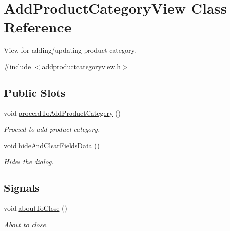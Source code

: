 \hypertarget{class_add_product_category_view}{\section{\-Add\-Product\-Category\-View \-Class \-Reference}
\label{class_add_product_category_view}
}


\-View for adding/updating product category.  




{\ttfamily \#include $<$addproductcategoryview.\-h$>$}

\subsection*{\-Public \-Slots}
\begin{DoxyCompactItemize}
\item 
void \hyperlink{class_add_product_category_view_a4776cc85ae578a68e657bb63cba8a4c5}{proceed\-To\-Add\-Product\-Category} ()
\begin{DoxyCompactList}\small\item\em \-Proceed to add product category. \end{DoxyCompactList}\item 
void \hyperlink{class_add_product_category_view_a5fddb29e2001df4d9237ccd0dd172b4f}{hide\-And\-Clear\-Fields\-Data} ()
\begin{DoxyCompactList}\small\item\em \-Hides the dialog. \end{DoxyCompactList}\end{DoxyCompactItemize}
\subsection*{\-Signals}
\begin{DoxyCompactItemize}
\item 
void \hyperlink{class_add_product_category_view_ad9dedd2406e1c0d28a1ef36ef1c6001c}{about\-To\-Close} ()
\begin{DoxyCompactList}\small\item\em \-About to close. \end{DoxyCompactList}\end{DoxyCompactItemize}
